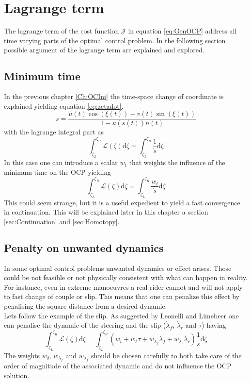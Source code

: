 \section{Lagrange term}
%
The lagrange term of the cost function $\mathcal{J}$ in equation \ref{eq:GenOCP} address all time varying parts of the optimal control problem. In the following section possible argument of the lagrange term are explained and explored.
%
\subsection{Minimum time}
%
In the previous chapter \ref{Ch:OCIni} the time-space change of coordinate is explained yielding equation \ref{eq:zetadot}.
%
\begin{equation}
    \label{eq:zetadot}
    \dot{s} = \frac{u(t) \cos(\xi(t)) - v(t) \sin(\xi(t))}{1-\kappa(s(t)) n(t)}
\end{equation}
%
with the lagrange integral part as 
%
\begin{equation}
    \int_{\zeta_L}^{\zeta_R} \mathcal{L}(\zeta)\mathrm{d}\zeta = \int_{\zeta_L}^{\zeta_R} \frac{1}{\dot{s}} \mathrm{d}\zeta  
\end{equation}
%
In this case one can introduce a scalar $w_t$ that weights the influence of the minimum time on the OCP yielding
%
\begin{equation}
    \int_{\zeta_L}^{\zeta_R} \mathcal{L}(\zeta)\mathrm{d}\zeta = \int_{\zeta_L}^{\zeta_R} \frac{w_t}{\dot{s}} \mathrm{d}\zeta  
\end{equation}
%
This could seem strange, but it is a useful expedient to yield a fast convergence in continuation. This will be explained later in this chapter a section \ref{sec:Continuation} and \ref{sec:Homotopy}.
%
\subsection{Penalty on unwanted dynamics}
%
In some optimal control problems unwanted dynamics or effect arises. Those could be not feasible or not physically consistent with what can happen in reality. For instance, even in extreme manoeuvres a real rider cannot and will not apply to fast change of couple or slip. This means that one can penalize this effect by penalising the square distance from a desired dynamic.\\
Lets follow the example of the slip. As suggested by Leonelli and Limebeer \cite{leonelli2019optimal} one can penalise the dynamic of the steering and the slip ($\dot{\lambda}_f$, $\dot{\lambda}_r$ and $\tau$) having
%
\begin{equation}
    \int_{\zeta_L}^{\zeta_R} \mathcal{L}(\zeta)\mathrm{d}\zeta = \int_{\zeta_L}^{\zeta_R} ( w_t + w_\delta \dot{\tau} + w_{\lambda_f} \dot{\lambda_f} + w_{\lambda_r} \dot{\lambda_r} ) \frac{1}{\dot{s}} \mathrm{d}\zeta  
\end{equation}
%
The weights $w_\delta$, $w_{\lambda_f}$ and $w_{\lambda_f}$ should be chosen carefully to both take care of the order of magnitude of the associated dynamic and do not influence the OCP solution.
%
